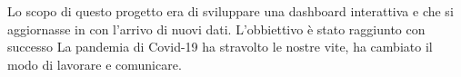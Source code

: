 
Lo scopo di questo progetto era di sviluppare una dashboard interattiva e che si aggiornasse in con l'arrivo di nuovi dati.
L'obbiettivo è stato raggiunto con successo
La pandemia di Covid-19 ha stravolto le nostre vite, ha cambiato il modo di lavorare e comunicare.